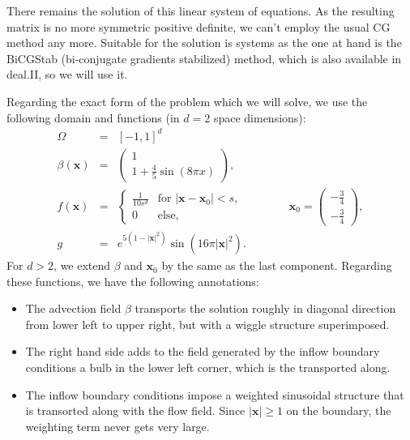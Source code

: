 \documentclass{article}
\renewcommand{\vec}[1]{{\mathbf #1}}
\begin{document}
There remains the solution of this linear system of equations. As the
resulting matrix is no more symmetric positive definite, we can't
employ the usual CG method any more. Suitable for the solution is
systems as the one at hand is the BiCGStab (bi-conjugate gradients
stabilized) method, which is also available in deal.II, so we will use
it.


Regarding the exact form of the problem which we will solve, we use
the following domain and functions (in $d=2$ space dimensions):
\begin{eqnarray*}
  \Omega &=& [-1,1]^d \\
  \beta(\vec x) 
  &=&
  \left(
    \begin{array}{c}1 \\ 1+\frac 45 \sin(8\pi x)\end{array} 
  \right),
  \\
  f(\vec x)
  &=&
  \left\{
    \begin{array}{ll}
	\frac 1{10 s^d} & 
	\text{for $|\vec x-\vec x_0|<s$}, \\
	0 & \text{else},
    \end{array}
  \right.
  \qquad\qquad
  \vec x_0 
  =
  \left(
    \begin{array}{c} -\frac 34 \\ -\frac 34\end{array}
  \right),
  \\
  g
  &=&
  e^{5(1-|\vec x|^2)} \sin(16\pi|\vec x|^2).
\end{eqnarray*}
For $d>2$, we extend $\beta$ and $\vec x_0$ by the same as the last
component. Regarding these functions, we have the following
annotations:
\begin{itemize}
\item The advection field $\beta$ transports the solution roughly in
diagonal direction from lower left to upper right, but with a wiggle
structure superimposed.
\item The right hand side adds to the field generated by the inflow
boundary conditions a bulb in the lower left corner, which is the
transported along.
\item The inflow boundary conditions impose a weighted sinusoidal
structure that is transorted along with the flow field. Since $|\vec
x|\ge 1$ on the boundary, the weighting term never gets very large.
\end{itemize}
\end{document}
